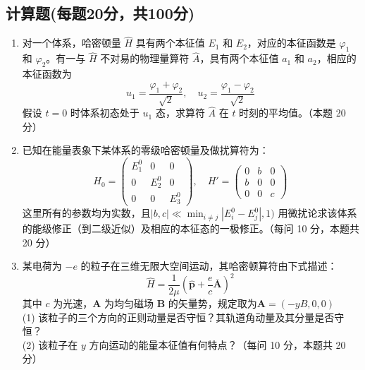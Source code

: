 \subsection{计算题(每题20分，共100分)}
\begin{enumerate}
\item 对一个体系，哈密顿量 $\hat{H}$ 具有两个本征值 $E_1$ 和 $E_2$，对应的本征函数是 $\varphi_1$ 和 $\varphi_2$。有一与 $\hat{H}$ 不对易的物理量算符 $\hat{A}$，具有两个本征值 $a_1$ 和 $a_2$，相应的本征函数为
$$u_1 = \frac{\varphi_1 + \varphi_2}{\sqrt{2}}, \quad u_2 = \frac{\varphi_1 - \varphi_2}{\sqrt{2}}~$$
假设 $t=0$ 时体系初态处于 $u_1$ 态，求算符 $\hat{A}$ 在 $t$ 时刻的平均值。（本题 20 分）
\item 已知在能量表象下某体系的零级哈密顿量及做扰算符为：
$$H_0 = \begin{pmatrix}E_1^0 & 0 & 0 \\0 & E_2^0 & 0 \\0 & 0 & E_3^0\end{pmatrix}, \quad H' = \begin{pmatrix}0 & b & 0 \\b & 0 & 0 \\0 & 0 & c\end{pmatrix}~$$
这里所有的参数均为实数，且$|b, c| \ll \min_{i \neq j} |E_i^0 - E_j^0|, 1)$
用微扰论求该体系的能级修正（到二级近似）及相应的本征态的一极修正。（每问 10 分，本题共 20 分）
\item 某电荷为 $-e$ 的粒子在三维无限大空间运动，其哈密顿算符由下式描述：
$$\hat{H} = \frac{1}{2\mu} \left( \hat{\mathbf{p}} + \frac{e}{c} \overline{\mathbf{A}} \right)^2~$$
其中 $c$ 为光速，$\mathbf{A}$ 为均匀磁场 $\mathbf{B}$ 的矢量势，规定取为$\mathbf{A} = (-yB, 0, 0)$\\
(1) 该粒子的三个方向的正则动量是否守恒？其轨道角动量及其分量是否守恒？\\
(2) 该粒子在 $y$ 方向运动的能量本征值有何特点？（每问 10 分，本题共 20 分）
\end{enumerate}


